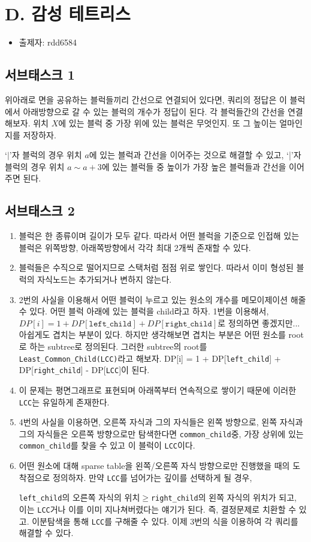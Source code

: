 \documentclass{article}
\begin{document}
	\newpage
	\section{D. 감성 테트리스}
	
	\begin{itemize}
		\item 출제자: rdd6584
	\end{itemize}
	
	\subsection{서브태스크 1}
	위아래로 면을 공유하는 블럭들끼리 간선으로 연결되어 있다면, 쿼리의 정답은 이 블럭에서 아래방향으로 갈 수 있는 블럭의 개수가 정답이 된다. 각 블럭들간의 간선을 연결해보자. 위치 $X$에 있는 블럭 중 가장 위에 있는 블럭은 무엇인지. 또 그 높이는 얼마인지를 저장하자.\newline
	
	`$|$'자 블럭의 경우 위치 $a$에 있는 블럭과 간선을 이어주는 것으로 해결할 수 있고, `|'자 블럭의 경우 위치 $a\sim a+3$에 있는 블럭들 중 높이가 가장 높은 블럭들과 간선을 이어주면 된다.
	
	\subsection{서브태스크 2}
	\begin{enumerate}
		\item 블럭은 한 종류이며 길이가 모두 같다. 따라서 어떤 블럭을 기준으로 인접해 있는 블럭은 위쪽방향, 아래쪽방향에서 각각 최대 2개씩 존재할 수 있다.
		\item 블럭들은 수직으로 떨어지므로 스택처럼 점점 위로 쌓인다. 따라서 이미 형성된 블럭의 자식노드는 추가되거나 변하지 않는다.
		\item 2번의 사실을 이용해서 어떤 블럭이 누르고 있는 원소의 개수를 메모이제이션 해줄 수 있다. 어떤 블럭 아래에 있는 블럭을 child라고 하자. 1번을 이용해서, $DP[i] = 1 + DP[\texttt{left\_child}] + DP[\texttt{right\_child}]$로 정의하면 좋겠지만... 아쉽게도 겹치는 부분이 있다. 하지만 생각해보면 겹치는 부분은 어떤 원소를 root로 하는 subtree로 정의된다. 그러한 subtree의 root를 \texttt{Least\_Common\_Child(LCC)}라고 해보자. DP[i] = 1 + DP[\texttt{left\_child}] + DP[\texttt{right\_child}] - DP[\texttt{LCC}]이 된다.
		\item 이 문제는 평면그래프로 표현되며 아래쪽부터 연속적으로 쌓이기 때문에 이러한 \texttt{LCC}는 유일하게 존재한다.
		\item 4번의 사실을 이용하면, 오른쪽 자식과 그의 자식들은 왼쪽 방향으로, 왼쪽 자식과 그의 자식들은 오른쪽 방향으로만 탐색한다면 \texttt{common\_child}중, 가장 상위에 있는 \texttt{common\_child}를 찾을 수 있고 이 블럭이 \texttt{LCC}이다.
		\item 어떤 원소에 대해 sparse table을 왼쪽/오른쪽 자식 방향으로만 진행했을 때의 도착점으로 정의하자. 만약 \texttt{LCC}를 넘어가는 깊이를 선택하게 될 경우,
		
		\texttt{left\_child}의 오른쪽 자식의 위치$\ge$\texttt{right\_child}의 왼쪽 자식의 위치가 되고, 이는 \texttt{LCC}거나 이를 이미 지나쳐버렸다는 얘기가 된다. 즉, 결정문제로 치환할 수 있고. 이분탐색을 통해 \texttt{LCC}를 구해줄 수 있다. 이제 3번의 식을 이용하여 각 쿼리를 해결할 수 있다.
	\end{enumerate}
\end{document}
